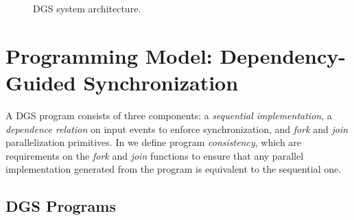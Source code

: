 \begin{figure}
  \centering

  \caption{DGS system architecture.}
\label{dgs:fig:system-architecture-overview}
\end{figure}

\section{Programming Model: Dependency-Guided Synchronization}
\label{dgs:sec:prog-model}

A DGS program consists of three components: a
\emph{sequential implementation}, a \emph{dependence relation} on input
events to enforce synchronization, and \emph{fork} and \emph{join}
parallelization primitives.
In  we define program \emph{consistency}, which are requirements on the \emph{fork} and \emph{join} functions to ensure that any parallel implementation generated from the program is equivalent to the sequential one.

\subsection{DGS Programs}
\label{dgs:ssec:prog-model-walkthrough}

